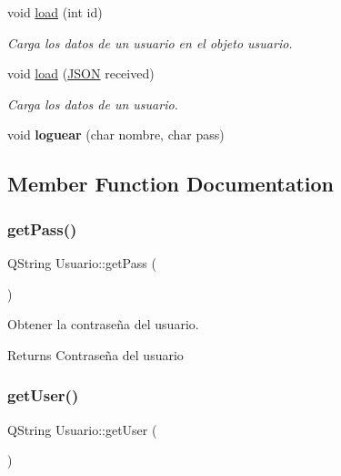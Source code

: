 \begin{DoxyCompactItemize}
void \mbox{\hyperlink{classUsuario_a582cfc5fb035575f66240d1784c50632}{load}} (int id)
\begin{DoxyCompactList}\small\item\em Carga los datos de un usuario en el objeto usuario. \end{DoxyCompactList}\item 
void \mbox{\hyperlink{classUsuario_ae1167727130e5f8fb07fad0d7c179c41}{load}} (\mbox{\hyperlink{jugador_8h_ab6104b89642419db4e355b7b2e40abbe}{J\+S\+ON}} received)
\begin{DoxyCompactList}\small\item\em Carga los datos de un usuario. \end{DoxyCompactList}\item 
\mbox{\label{classUsuario_a8405dee8a5ebcddfa407d4a62d4ce994}} 
void {\bfseries loguear} (char nombre, char pass)
\end{DoxyCompactItemize}


\subsection{Member Function Documentation}
\mbox{\label{classUsuario_ae00ae9ee09459165c7b7ecb060ff7071}} 
\subsubsection{\texorpdfstring{get\+Pass()}{getPass()}}
{\footnotesize\ttfamily Q\+String Usuario\+::get\+Pass (\begin{DoxyParamCaption}{ }\end{DoxyParamCaption})}



Obtener la contraseña del usuario. 

\begin{DoxyReturn}{Returns}
Contraseña del usuario 
\end{DoxyReturn}
\mbox{\label{classUsuario_a26932183472124e9054d95c534e6f7e9}} 
\subsubsection{\texorpdfstring{get\+User()}{getUser()}}
{\footnotesize\ttfamily Q\+String Usuario\+::get\+User (\begin{DoxyParamCaption}{ }\end{DoxyParamCaption})}



